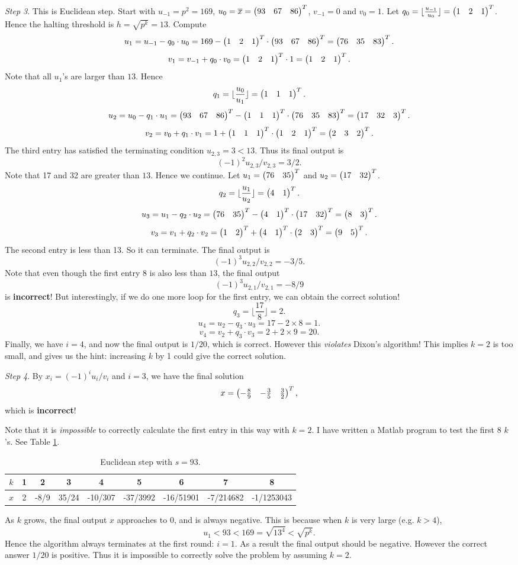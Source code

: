 \documentclass[12pt]{article}
\theoremstyle{plain}
\begin{document}
\emph{Step 3}. This is Euclidean step. Start with $u_{-1} = p^2 = 169$, $u_0=\overline{x} = \begin{pmatrix}93 & 67 & 86\end{pmatrix}^T$, $v_{-1} = 0$ and $v_0=1$. Let $q_0 = \lfloor \frac{u_{-1}}{u_0} \rfloor = \begin{pmatrix}1 & 2 & 1\end{pmatrix}^T$. Hence the halting threshold is $h = \sqrt{p^k} = 13$. Compute
$$u_1 = u_{-1} - q_0\cdot u_0 = 169 - \begin{pmatrix}1 & 2 & 1\end{pmatrix}^T \cdot \begin{pmatrix}93 & 67 & 86\end{pmatrix}^T = \begin{pmatrix}76 & 35 & 83\end{pmatrix}^T.$$
$$v_1 = v_{-1} + q_0\cdot v_0 = \begin{pmatrix}1 & 2 & 1\end{pmatrix}^T \cdot 1 = \begin{pmatrix}1 & 2 & 1\end{pmatrix}^T.$$
Note that all $u_1$'s are larger than $13$. Hence
$$q_1 = \lfloor \frac{u_0}{u_1} \rfloor = \begin{pmatrix}1 & 1 & 1\end{pmatrix}^T.$$
$$u_2 = u_0 - q_1\cdot u_1 = \begin{pmatrix}93 & 67 & 86\end{pmatrix}^T - \begin{pmatrix}1 & 1 & 1\end{pmatrix}^T \cdot \begin{pmatrix}76 & 35 & 83\end{pmatrix}^T = \begin{pmatrix}17 & 32 & 3\end{pmatrix}^T.$$
$$v_2 = v_0 + q_1\cdot v_1 = 1 + \begin{pmatrix}1 & 1 & 1\end{pmatrix}^T \cdot \begin{pmatrix}1 & 2 & 1\end{pmatrix}^T = \begin{pmatrix}2&3&2\end{pmatrix}^T.$$
The third entry has satisfied the terminating condition $u_{2,3} = 3 < 13$. Thus its final output is 
$$(-1)^2u_{2,3}/v_{2,3} = 3/2.$$
Note that 17 and 32 are greater than $13$. Hence we continue. Let $u_1 = \begin{pmatrix}76 & 35\end{pmatrix}^T$ and $u_2 = \begin{pmatrix}17 & 32\end{pmatrix}^T$.
$$q_2 = \lfloor \frac{u_1}{u_2} \rfloor = \begin{pmatrix}4 & 1\end{pmatrix}^T.$$
$$u_3 = u_1 - q_2\cdot u_2 = \begin{pmatrix}76 & 35\end{pmatrix}^T - \begin{pmatrix}4 & 1\end{pmatrix}^T \cdot \begin{pmatrix}17 & 32\end{pmatrix}^T = \begin{pmatrix}8 & 3\end{pmatrix}^T.$$
$$v_3 = v_1 + q_2\cdot v_2 = \begin{pmatrix}1 & 2\end{pmatrix}^T + \begin{pmatrix}4 & 1\end{pmatrix}^T \cdot \begin{pmatrix}2&3\end{pmatrix}^T = \begin{pmatrix}9 & 5\end{pmatrix}^T.$$
The second entry is less than 13. So it can terminate. The final output is 
$$(-1)^3u_{2,2}/v_{2,2} = -3/5.$$
Note that even though the first entry 8 is also less than $13$, the final output 
$$(-1)^3u_{2,1}/v_{2,1} = -8/9$$
 is {\bf incorrect}!
But interestingly, if we do one more loop for the first entry, we can obtain the correct solution!
$$q_3 = \lfloor \frac{17}{8} \rfloor = 2.$$
$$u_4 = u_2 - q_3\cdot u_3 = 17 - 2\times 8 = 1.$$
$$v_4 = v_2 + q_3\cdot v_3 = 2 + 2\times 9 = 20.$$
Finally, we have $i=4$, and now the final output is $1/20$, which is correct.
However this {\it violates} Dixon's algorithm! This implies $k=2$ is too small, and gives us the hint: increasing $k$ by 1 could give the correct solution.

\emph{Step 4}. By $x_i = (-1)^i u_i/v_i$ and $i=3$, we have the final solution
$$x = \begin{pmatrix}-\frac{8}{9} & -\frac{3}{5} & \frac{3}{2}\end{pmatrix}^T,$$
which is {\bf incorrect}!

Note that it is \emph{impossible} to correctly calculate the first entry in this way with $k=2$. I have written a Matlab program to test the first 8 $k$'s. See Table \ref{tab:1}.
\begin{table}
\centering
\caption{Euclidean step with $s=93$.}
\begin{tabular}{c || c| c| c| c| c| c |c |c}
\hline
$k$ & 1 & 2 & 3 & 4 & 5 & 6 & 7 & 8\\
\hline
$x$ & 2 & -8/9 & 35/24 & -10/307 & -37/3992 & -16/51901 & -7/214682 & -1/1253043 \\
\hline
\end{tabular}
\label{tab:1}
\end{table}
As $k$ grows, the final output $x$ approaches to 0, and is always negative. This is because when $k$ is very large (e.g. $k>4$), 
$$u_1 < 93 < 169 = \sqrt{13^4} < \sqrt{p^k}.$$
Hence the algorithm always terminates at the first round: $i=1$. As a result the final output should be negative. However the correct answer $1/20$ is positive. Thus it is impossible to correctly solve the problem by assuming $k=2$.
\end{document}
